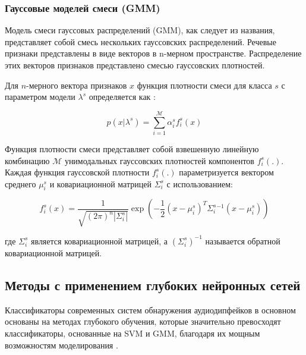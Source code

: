 \subsubsection{Гауссовые моделей смеси (GMM)}

Модель смеси гауссовых распределений (GMM), как следует из названия, представляет собой смесь нескольких гауссовских распределений. Речевые признаки представлены в виде векторов в n-мерном пространстве. Распределение этих векторов признаков представлено смесью гауссовских плотностей. 

Для \(n\)-мерного вектора признаков \(x\) функция плотности смеси для класса \(s\) с параметром модели \(\lambda^{s}\) определяется как \cite{JOTHILAKSHMI2016301}:

\[
    p(x | \lambda^{s}) = \sum_{i = 1}^{\mathcal{M}} \alpha^{s}_{i} f_{i}^{s}(x)
\]

Функция плотности смеси представляет собой взвешенную линейную комбинацию \(\mathcal{M}\) унимодальных гауссовских плотностей компонентов \(f_ {i}^{s}(.)\). Каждая функция гауссовской плотности \(f_{i}^{s}(.)\) параметризуется вектором среднего \(\mu_{i}^{s}\) и ковариационной матрицей \(\Sigma_{i}^{s}\) с использованием:

\[
    f_{i}^{s}(x) = \frac{1}{\sqrt{(2\pi)^{n}|\Sigma_{i}^{s}|}} \exp \left(-\frac{1}{2}(x - \mu_{i}^{s})^T \Sigma_{i}^{s}^{-1} (x - \mu_{i}^{s})\right)
\]

где \(\Sigma_{i}^{s}\) является ковариационной матрицей, а \((\Sigma_{i}^{s})^{-1}\) называется обратной ковариационной матрицей.
% 

\subsection{Методы с применением глубоких нейронных сетей}


Классификаторы современных систем обнаружения аудиодипфейков в основном основаны на методах глубокого обучения, которые значительно превосходят классификаторы, основанные на SVM и GMM, благодаря их мощным возможностям моделирования \cite{godoy2015using}.

